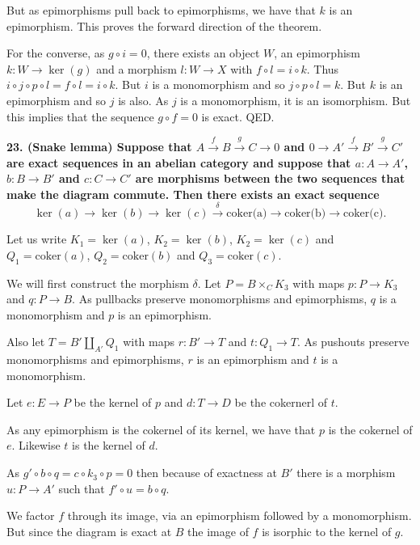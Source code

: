 \documentclass[12pt]{article}
\begin{document}
But as epimorphisms pull back to epimorphisms, we have that $k$ is an epimorphism. This proves the forward direction of the theorem.

For the converse, as $g\circ i = 0$, there exists an object $W$, an epimorphism $k : W \to \ker(g)$ and a morphism $l : W \to X$ with $f\circ l = i\circ k$. Thus $i\circ j\circ p\circ l = f\circ l = i\circ k$. But $i$ is a monomorphism and so $j\circ p\circ l = k$. But $k$ is an epimorphism and so $j$ is also. As $j$ is a monomorphism, it is an isomorphism. But this implies that the sequence $g\circ f = 0$ is exact. QED.

\textbf{23. (Snake lemma) Suppose that $A \overset{f}{\rightarrow} B \overset{g}{\rightarrow} C \rightarrow 0$ and $0 \rightarrow A' \overset{f}{\rightarrow} B' \overset{g}{\rightarrow} C'$ are exact sequences in an abelian category and suppose that $a : A \to A'$, $b : B \to B'$ and $c : C \to C'$ are morphisms between the two sequences that make the diagram commute. Then there exists an exact sequence
$$\ker(a) \rightarrow \ker(b) \rightarrow \ker(c) \overset{\delta}{\rightarrow} \mbox{coker(a)} \rightarrow \mbox{coker(b)} \rightarrow \mbox{coker(c)}.$$}

Let us write $K_1 = \ker(a)$, $K_2 = \ker(b)$, $K_2 = \ker(c)$ and $Q_1 = \mbox{coker}(a)$, $Q_2 = \mbox{coker}(b)$ and $Q_3 = \mbox{coker}(c)$.

We will first construct the morphism $\delta$. Let $P = B\times_C K_3$ with maps $p : P \to K_3$ and $q : P \to B$. As pullbacks preserve monomorphisms and epimorphisms, $q$ is a monomorphism and $p$ is an epimorphism.

Also let $T = B' \coprod_{A'} Q_1$ with maps $r : B' \to T$ and $t : Q_1 \to T$. As pushouts preserve monomorphisms and epimorphisms, $r$ is an epimorphism and $t$ is a monomorphism.

Let $e: E \to P$ be the kernel of $p$ and $d : T \to D$ be the cokernerl of $t$.

As any epimorphism is the cokernel of its kernel, we have that $p$ is the cokernel of $e$. Likewise $t$ is the kernel of $d$.

As $g'\circ b\circ q = c\circ k_3\circ p = 0$ then because of exactness at $B'$ there is a morphism $u : P \to A'$ such that $f'\circ u = b\circ q$.

We factor $f$ through its image, via an epimorphism followed by a monomorphism. But since the diagram is exact at $B$ the image of $f$ is isorphic to the kernel of $g$.
\end{document}
